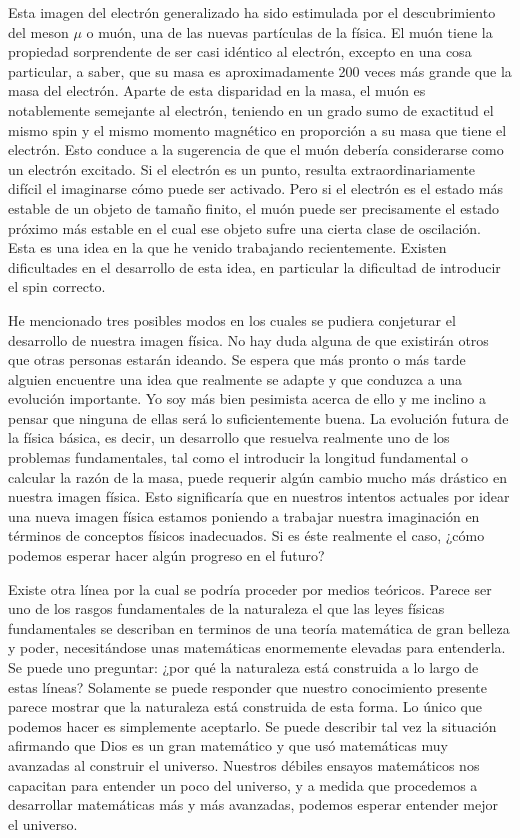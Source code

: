 \documentclass[a4paper, 12pt]{article}
\begin{document}
Esta imagen del electrón generalizado ha sido estimulada por el descubrimiento del meson $\mu$ o muón, una de las nuevas partículas de la física. El muón tiene la propiedad sorprendente de ser casi idéntico al electrón, excepto en una cosa particular, a saber, que su masa es aproximadamente 200 veces más grande que la masa del electrón. Aparte de esta disparidad en la masa, el muón es notablemente semejante al electrón, teniendo en un grado sumo de exactitud el mismo spin y el mismo momento magnético en proporción a su masa que tiene el electrón. Esto conduce a la sugerencia de que el muón debería considerarse como un electrón excitado. Si el electrón es un punto, resulta extraordinariamente difícil el imaginarse cómo puede ser activado. Pero si el electrón es el estado más estable de un objeto de tamaño finito, el muón puede ser precisamente el estado próximo más estable en el cual ese objeto sufre una cierta clase de oscilación. Esta es una idea en la que he venido trabajando recientemente. Existen dificultades en el desarrollo de esta idea, en particular la dificultad de introducir el spin correcto.

He mencionado tres posibles modos en los cuales se pudiera conjeturar el desarrollo de nuestra imagen física. No hay duda alguna de que existirán otros que otras personas estarán ideando. Se espera que más pronto o más tarde alguien encuentre una idea que realmente se adapte y que conduzca a una evolución importante. Yo soy más bien pesimista acerca de ello y me inclino a pensar que ninguna de ellas será lo suficientemente buena. La evolución futura de la física básica, es decir, un desarrollo que resuelva realmente uno de los problemas fundamentales, tal como el introducir la longitud fundamental o calcular la razón de la masa, puede requerir algún cambio mucho más drástico en nuestra imagen física. Esto significaría que en nuestros intentos actuales por idear una nueva imagen física estamos poniendo a trabajar nuestra imaginación en términos de conceptos físicos inadecuados. Si es éste realmente el caso, ¿cómo podemos esperar hacer algún progreso en el futuro?

Existe otra línea por la cual se podría proceder por medios teóricos. Parece ser uno de los rasgos fundamentales de la naturaleza el que las leyes físicas fundamentales se describan en terminos de una teoría matemática de gran belleza y poder, necesitándose unas matemáticas enormemente elevadas para entenderla. Se puede uno preguntar: ¿por qué la naturaleza está construida a lo largo de estas líneas? Solamente se puede responder que nuestro conocimiento presente parece mostrar que la naturaleza está construida de esta forma. Lo único que podemos hacer es simplemente aceptarlo. Se puede describir tal vez la situación afirmando que Dios es un gran matemático y que usó matemáticas muy avanzadas al construir el universo. Nuestros débiles ensayos matemáticos nos capacitan para entender un poco del universo, y a medida que procedemos a desarrollar matemáticas más y más avanzadas, podemos esperar entender mejor el universo.
\end{document}
